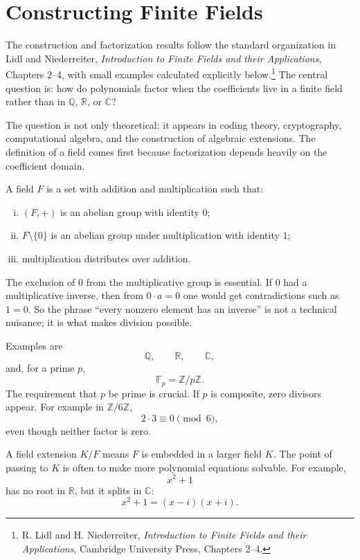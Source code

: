 
\section{Constructing Finite Fields}

The construction and factorization results follow the standard organization in Lidl and Niederreiter, \emph{Introduction to Finite Fields and their Applications}, Chapters 2--4, with small examples calculated explicitly below.\footnote{R. Lidl and H. Niederreiter, \emph{Introduction to Finite Fields and their Applications}, Cambridge University Press, Chapters 2--4.} The central question is: how do polynomials factor when the coefficients live in a finite field rather than in \(\mathbb Q\), \(\mathbb R\), or \(\mathbb C\)?

The question is not only theoretical: it appears in coding theory, cryptography, computational algebra, and the construction of algebraic extensions.  The definition of a field comes first because factorization depends heavily on the coefficient domain.

A field \(F\) is a set with addition and multiplication such that:
\begin{enumerate}[(i)]
  \item \((F,+)\) is an abelian group with identity \(0\);
  \item \(F\setminus\{0\}\) is an abelian group under multiplication with identity \(1\);
  \item multiplication distributes over addition.

\end{enumerate}
The exclusion of \(0\) from the multiplicative group is essential.  If \(0\) had a multiplicative inverse, then from \(0\cdot a=0\) one would get contradictions such as \(1=0\).  So the phrase ``every nonzero element has an inverse'' is not a technical nuisance; it is what makes division possible.

Examples are
\[
  \mathbb Q,\qquad \mathbb R,\qquad \mathbb C,
\]
and, for a prime \(p\),
\[
  \mathbb F_p=\mathbb Z/p\mathbb Z.
\]
The requirement that \(p\) be prime is crucial.  If \(p\) is composite, zero divisors appear.  For example in \(\mathbb Z/6\mathbb Z\),
\[
  2\cdot3\equiv0\pmod6,
\]
even though neither factor is zero.

A field extension \(K/F\) means \(F\) is embedded in a larger field \(K\).  The point of passing to \(K\) is often to make more polynomial equations solvable.  For example,
\[
  x^2+1
\]
has no root in \(\mathbb R\), but it splits in \(\mathbb C\):
\[
  x^2+1=(x-i)(x+i).
\]

